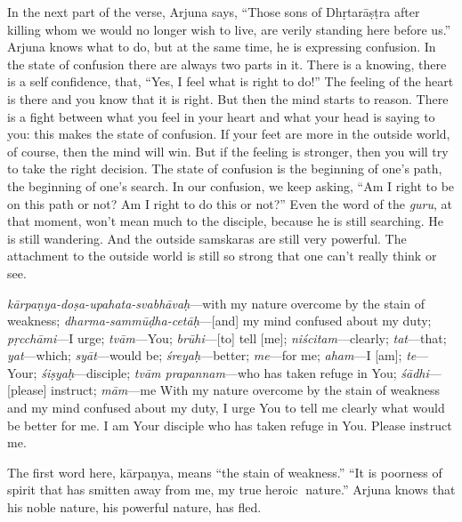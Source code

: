 In the next part of the verse, Arjuna says, “Those sons of Dhṛtarāṣṭra after killing whom we would no longer wish to live, are verily standing here before us.” Arjuna knows what to do, but at the same time, he is expressing confusion. In the state of confusion there are always two parts in it. There is a knowing, there is a selfconfidence, that, “Yes, I feel what is right to do!” The feeling of the heart is there and you know that it is right. But then the mind starts to reason. There is a fight between what you feel in your heart and what your head is saying to you: this makes the state of confusion. If your feet are more in the outside world, of course, then the mind will win. But if the feeling is stronger, then you will try to take the right decision. The state of confusion is the beginning of one’s path, the beginning of one’s search. In our confusion, we keep asking, “Am I right to be on this path or not? Am I right to do this or not?” Even the word of the \textit{guru}, at that moment, won’t mean much to the disciple, because he is still searching. He is still wandering. And the outside samskaras are still very powerful. The attachment to the outside world is still so strong that one can’t really think or see.

{%
  \textit{kārpaṇya-doṣa-upahata-svabhāvaḥ}---with my nature overcome by the stain of weakness; 
  \textit{dharma-sammūḍha-cetāḥ}---[and] my mind confused about my duty; 
  \textit{pṛcchāmi}---I urge; 
  \textit{tvām}---You; 
  \textit{brūhi}---[to] tell [me]; 
  \textit{niścitam}---clearly; 
  \textit{tat}---that; 
  \textit{yat}---which; 
  \textit{syāt}---would be; 
  \textit{śreyaḥ}---better; 
  \textit{me}---for me; 
  \textit{aham}---I [am]; 
  \textit{te}---Your; 
  \textit{śiṣyaḥ}---disciple; 
  \textit{tvām prapannam}---who has taken refuge in You; 
  \textit{śādhi}---[please] instruct; 
  \textit{mām}---me
}
{%
  With my nature overcome by the stain of weakness and my mind confused about my duty, I urge You to tell me clearly what would be better for me. I am Your disciple who has taken refuge in You. Please instruct me.
}

The first word here, kārpaṇya, means “the stain of weakness.” “It is poorness of spirit that has smitten away from me, my true heroic nature.” Arjuna knows that his noble nature, his powerful nature, has fled. 

